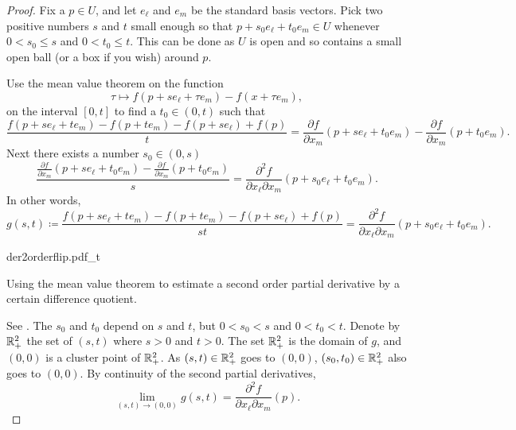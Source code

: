 \begin{proof}
Fix a $p \in U$, and let $e_{\ell}$ and $e_m$ be the standard basis vectors.
Pick two positive numbers $s$ and $t$ small enough so that
$p+s_0e_{\ell} +t_0e_m \in U$ whenever
$0 < s_0 \leq s$ and $0 < t_0 \leq t$.  This can be done as $U$ is open and so
contains a small open ball (or a box if you wish) around $p$.

Use the mean value theorem on the function
\begin{equation*}
\tau \mapsto f(p+se_{\ell} + \tau e_m)-f(x + \tau e_m) ,
\end{equation*}
on the interval $[0,t]$
to find a $t_0 \in (0,t)$
such that
\begin{equation*}
\frac{f(p+se_{\ell} + te_m)- f(p+t e_m) - f(p+s e_{\ell})+f(p)}{t}
=
\frac{\partial f}{\partial x_m}(p + s e_{\ell} + t_0 e_m)
-
\frac{\partial f}{\partial x_m}(p + t_0 e_m) .
\end{equation*}
Next there exists a number $s_0 \in (0,s)$
\begin{equation*}
\frac{\frac{\partial f}{\partial x_m}(p + s e_{\ell} + t_0 e_m)
-
\frac{\partial f}{\partial x_m}(p + t_0 e_m)}{s}
=
\frac{\partial^2 f}{\partial x_{\ell} \partial x_m}(p + s_0 e_{\ell} + t_0 e_m) .
\end{equation*}
In other words,
\begin{equation*}
g(s,t) \coloneqq
\frac{f(p+se_{\ell} + te_m)- f(p+t e_m) - f(p+s e_{\ell})+f(p)}{st}
=
\frac{\partial^2 f}{\partial x_{\ell} \partial x_m}(p + s_0 e_{\ell} + t_0 e_m) .
\end{equation*}

\begin{myfigureht}
{der2orderflip.pdf_t}
\caption{Using the mean value theorem to estimate
a second order partial derivative by
a certain difference quotient.\label{fig:der2orderflip}}
\end{myfigureht}

See .
The $s_0$ and $t_0$ depend on $s$ and $t$,
but $0 < s_0 < s$ and
$0 < t_0 < t$.
Denote by ${\mathbb{R}}_+^2$ the set of $(s,t)$ where $s > 0$ and $t > 0$.
The set ${\mathbb{R}}_+^2$ is the domain of $g$, and $(0,0)$ is a cluster
point of ${\mathbb{R}}_+^2$.
As $(s,t) \in {\mathbb{R}}_+^2$ goes to $(0,0)$, $(s_0,t_0) \in {\mathbb{R}}_+^2$ also goes to
$(0,0)$.
By continuity of the second partial derivatives,
\begin{equation*}
\lim_{(s,t) \to (0,0)} g(s,t) = 
\frac{\partial^2 f}{\partial x_{\ell} \partial x_m}(p) .
\end{equation*}


\end{proof}
